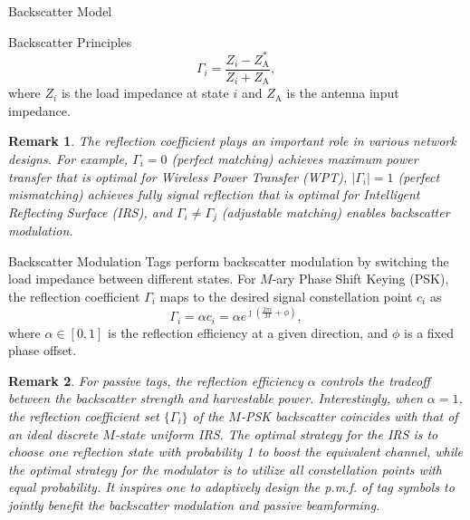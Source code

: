 \documentclass[journal]{IEEEtran}
\newtheorem{remark}{Remark}
\begin{document}
\begin{section}{Backscatter Model}
\begin{subsection}{Backscatter Principles}
			\begin{equation}
				\Gamma_i = \frac{Z_i - Z_{\mathrm{A}}^*}{Z_i + Z_{\mathrm{A}}},
				\label{eq:reflection_coefficient}
			\end{equation}
			where $Z_i$ is the load impedance at state $i$ and $Z_{\mathrm{A}}$ is the antenna input impedance.
			\begin{remark}
				The reflection coefficient plays an important role in various network designs. For example, $\Gamma_i = 0$ (perfect matching) achieves maximum power transfer that is optimal for Wireless Power Transfer (WPT), $\lvert \Gamma_i \rvert = 1$ (perfect mismatching) achieves fully signal reflection that is optimal for Intelligent Reflecting Surface (IRS), and $\Gamma_i \ne \Gamma_j$ (adjustable matching) enables backscatter modulation.
			\end{remark}
		\end{subsection}

		\begin{subsection}{Backscatter Modulation}
			Tags perform backscatter modulation by switching the load impedance between different states. For $M$-ary Phase Shift Keying (PSK), the reflection coefficient $\Gamma_i$ maps to the desired signal constellation point $c_i$ as \cite{Thomas2012a}
			\begin{equation}
				\Gamma_i = \alpha c_i = \alpha e^{\jmath \left(\frac{2 \pi i}{M} + \phi\right)},
				\label{eq:backscatter_modulation}
			\end{equation}
			where $\alpha \in [0,1]$ is the reflection efficiency at a given direction, and $\phi$ is a fixed phase offset.
			\begin{remark}
				For passive tags, the reflection efficiency $\alpha$ controls the tradeoff between the backscatter strength and harvestable power. Interestingly, when $\alpha = 1$, the reflection coefficient set $\{\Gamma_i\}$ of the $M$-PSK backscatter coincides with that of an ideal discrete $M$-state uniform IRS. The optimal strategy for the IRS is to choose one reflection state with probability \num{1} to boost the equivalent channel, while the optimal strategy for the modulator is to utilize all constellation points with equal probability. It inspires one to adaptively design the p.m.f. of tag symbols to jointly benefit the backscatter modulation and passive beamforming.
			\end{remark}
		\end{subsection}
	\end{section}
\end{document}
